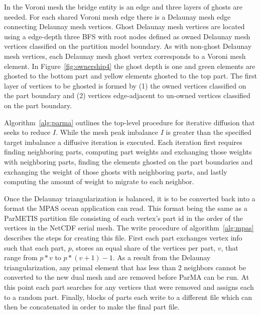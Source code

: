 \documentclass[a4paper]{article}
\begin{document}
In the Voroni mesh the bridge entity is an edge and three layers of ghosts are needed.  For each shared Voroni mesh edge there is a Delaunay mesh edge connecting Delaunay mesh vertices.  Ghost Delaunay mesh vertices are located using a edge-depth three BFS with root nodes defined as owned Delaunay mesh vertices classified on the partition model boundary.  As with non-ghost Delaunay mesh vertices, each Delaunay mesh ghost vertex corresponds to a Voroni mesh element.  In Figure~\ref{fig:ownership4} the ghost depth is one and green elements are ghosted to the bottom part and yellow elements ghosted to the top part.  The first layer of vertices to be ghosted is formed by (1) the owned vertices classified on the part boundary and (2) vertices edge-adjacent to un-owned vertices classified on the part boundary.

Algorithm~\ref{alg:parma} outlines the top-level procedure for iterative diffusion that seeks to reduce $I$.  While the mesh peak imbalance $I$ is greater than the specified target imbalance a diffusive iteration is executed.  Each iteration first requires finding neighboring parts, computing part weights and exchanging those weights with neighboring parts, finding the elements ghosted on the part boundaries and exchanging the weight of those ghosts with neighboring parts, and lastly computing the amount of weight to migrate to each neighbor.  

Once the Delaunay triangularization is balanced, it is to be converted back into a format the MPAS ocean application can read. This format being the same as a ParMETIS partition file consisting of each vertex's part id in the order of the vertices in the NetCDF serial mesh. The write procedure of algorithm~\ref{alg:mpas} describes the steps for creating this file. First each part exchanges vertex info such that each part, $p$, stores an equal share of the vertices per part, $v$, that range from $p*v$ to $p*(v+1)-1$. As a result from the Delaunay triangularization, any primal element that has less than 2 neighbors cannot be converted to the new dual mesh and are removed before ParMA can be run. At this point each part searches for any vertices that were removed and assigns each to a random part. Finally, blocks of parts each write to a different file which can then be concatenated in order to make the final part file.
\end{document}
